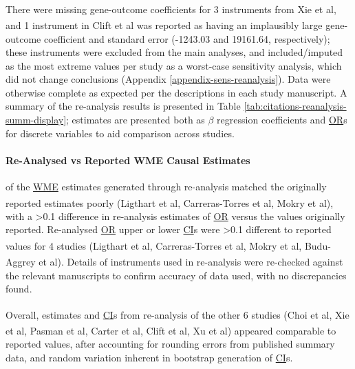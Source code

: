 \documentclass[
]{article}
\begin{document}
\leavevmode\newline There were missing gene-outcome coefficients for 3 instruments from Xie et al\textsuperscript{}, and 1 instrument in Clift et al\textsuperscript{} was reported as having an implausibly large gene-outcome coefficient and standard error (-1243.03 and 19161.64, respectively); these instruments were excluded from the main analyses, and included/imputed as the most extreme values per study as a worst-case sensitivity analysis, which did not change conclusions (Appendix \ref{appendix-sens-reanalysis}). Data were otherwise complete as expected per the descriptions in each study manuscript. A summary of the re-analysis results is presented in Table \ref{tab:citations-reanalysis-summ-display}; estimates are presented both as \(\beta\) regression coefficients and \hyperref[acronyms_OR]{OR}s for discrete variables to aid comparison across studies.

\paragraph{Re-Analysed vs Reported WME Causal Estimates}\label{re-analysed-vs-reported-wme-causal-estimates}

\leavevmode{} of the \hyperref[acronyms_WME]{WME} estimates generated through re-analysis matched the originally reported estimates poorly (Ligthart et al\textsuperscript{}, Carreras-Torres et al\textsuperscript{}, Mokry et al\textsuperscript{}), with a \textgreater0.1 difference in re-analysis estimates of \hyperref[acronyms_OR]{OR} versus the values originally reported. Re-analysed \hyperref[acronyms_OR]{OR} upper or lower \hyperref[acronyms_CI]{CI}s were \textgreater0.1 different to reported values for 4 studies (Ligthart et al\textsuperscript{}, Carreras-Torres et al\textsuperscript{}, Mokry et al\textsuperscript{}, Budu-Aggrey et al\textsuperscript{}). Details of instruments used in re-analysis were re-checked against the relevant manuscripts to confirm accuracy of data used, with no discrepancies found.

Overall, estimates and \hyperref[acronyms_CI]{CI}s from re-analysis of the other 6 studies (Choi et al\textsuperscript{}, Xie et al\textsuperscript{}, Pasman et al\textsuperscript{}, Carter et al\textsuperscript{}, Clift et al\textsuperscript{}, Xu et al\textsuperscript{}) appeared comparable to reported values, after accounting for rounding errors from published summary data, and random variation inherent in bootstrap generation of \hyperref[acronyms_CI]{CI}s.
\end{document}

